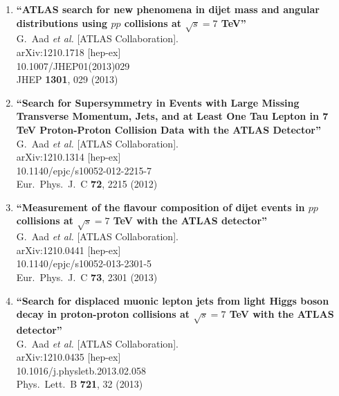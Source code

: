 \documentclass{article}
\begin{document}
\begin{enumerate}
\item%
{\bf ``ATLAS search for new phenomena in dijet mass and angular distributions using $pp$ collisions at $\sqrt{s}=7$ TeV''}
  \\{}G.~Aad {\it et al.}  [ATLAS Collaboration].
  \\{}arXiv:1210.1718 [hep-ex]
    \\{}10.1007/JHEP01(2013)029
\\{}JHEP {\bf 1301}, 029 (2013) %


\item%
{\bf ``Search for Supersymmetry in Events with Large Missing Transverse Momentum, Jets, and at Least One Tau Lepton in 7 TeV Proton-Proton Collision Data with the ATLAS Detector''}
  \\{}G.~Aad {\it et al.}  [ATLAS Collaboration].
  \\{}arXiv:1210.1314 [hep-ex]
    \\{}10.1140/epjc/s10052-012-2215-7
\\{}Eur.\ Phys.\ J.\ C {\bf 72}, 2215 (2012) %


\item%
{\bf ``Measurement of the flavour composition of dijet events in $pp$ collisions at $\sqrt{s}=7$ TeV with the ATLAS detector''}
  \\{}G.~Aad {\it et al.}  [ATLAS Collaboration].
  \\{}arXiv:1210.0441 [hep-ex]
    \\{}10.1140/epjc/s10052-013-2301-5
\\{}Eur.\ Phys.\ J.\ C {\bf 73}, 2301 (2013) %


\item%
{\bf ``Search for displaced muonic lepton jets from light Higgs boson decay in proton-proton collisions at $\sqrt{s}=7$ TeV with the ATLAS detector''}
  \\{}G.~Aad {\it et al.}  [ATLAS Collaboration].
  \\{}arXiv:1210.0435 [hep-ex]
    \\{}10.1016/j.physletb.2013.02.058
\\{}Phys.\ Lett.\ B {\bf 721}, 32 (2013) %



\end{enumerate}
\end{document}
